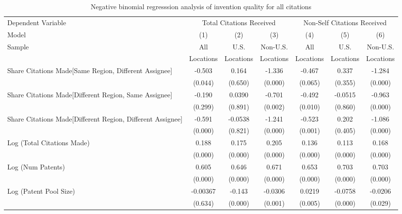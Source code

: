 \begin{sidewaystable}[htbp]\centering \caption{Negative binomial regresssion analysis of invention quality for all citations \label{a.e.o.t.n.model123192021}} \begin{tabular}{l*{6}{c}} \hline\hline
 Dependent Variable&\multicolumn{3}{c}{Total Citations Received}&\multicolumn{3}{c}{Non-Self Citations Received}\\
                Model&\multicolumn{1}{c}{(1)}&\multicolumn{1}{c}{(2)}&\multicolumn{1}{c}{(3)}&\multicolumn{1}{c}{(4)}&\multicolumn{1}{c}{(5)}&\multicolumn{1}{c}{(6)}\\
                 \hline
 \multirow{2}{*}{Sample}&\multicolumn{1}{c}{All}&\multicolumn{1}{c}{U.S.}&\multicolumn{1}{c}{Non-U.S.}&\multicolumn{1}{c}{All}&\multicolumn{1}{c}{U.S.}&\multicolumn{1}{c}{Non-U.S.}\\       
  &\multicolumn{1}{c}{Locations}&\multicolumn{1}{c}{Locations}&\multicolumn{1}{c}{Locations}&\multicolumn{1}{c}{Locations}&\multicolumn{1}{c}{Locations}&\multicolumn{1}{c}{Locations}\\ \hline
Share Citations Made[Same Region, Different Assignee]&   -0.503&    0.164&   -1.336&   -0.467&    0.337&   -1.284\\
                &  (0.044)&  (0.650)&  (0.000)&  (0.065)&  (0.355)&  (0.000)\\
Share Citations Made[Different Region, Same Assignee]&   -0.190&   0.0390&   -0.701&   -0.492&  -0.0515&   -0.963\\
                &  (0.299)&  (0.891)&  (0.002)&  (0.010)&  (0.860)&  (0.000)\\
Share Citations Made[Different Region, Different Assignee]&   -0.591&  -0.0538&   -1.241&   -0.523&    0.202&   -1.086\\
                &  (0.000)&  (0.821)&  (0.000)&  (0.001)&  (0.405)&  (0.000)\\
Log (Total Citations Made)&    0.188&    0.175&    0.205&    0.136&    0.113&    0.168\\
                &  (0.000)&  (0.000)&  (0.000)&  (0.000)&  (0.000)&  (0.000)\\
Log (Num Patents)&    0.605&    0.646&    0.671&    0.653&    0.703&    0.703\\
                &  (0.000)&  (0.000)&  (0.000)&  (0.000)&  (0.000)&  (0.000)\\
Log (Patent Pool Size)& -0.00367&   -0.143&  -0.0306&   0.0219&  -0.0758&  -0.0206\\
                &  (0.634)&  (0.000)&  (0.001)&  (0.005)&  (0.000)&  (0.029)\\

\end{tabular}
\end{sidewaystable}
